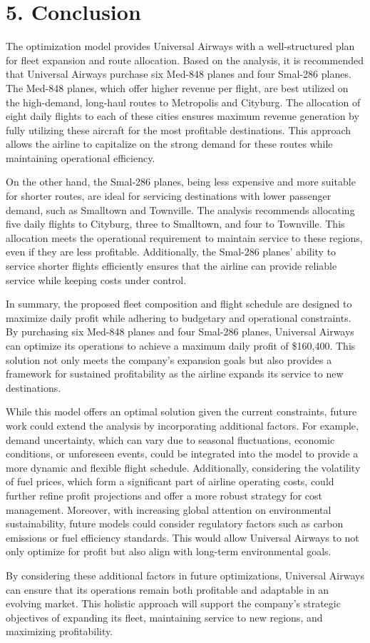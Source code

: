 \section*{5. Conclusion}

The optimization model provides Universal Airways with a well-structured plan for fleet expansion and route allocation. Based on the analysis, it is recommended that Universal Airways purchase six Med-848 planes and four Smal-286 planes. The Med-848 planes, which offer higher revenue per flight, are best utilized on the high-demand, long-haul routes to Metropolis and Cityburg. The allocation of eight daily flights to each of these cities ensures maximum revenue generation by fully utilizing these aircraft for the most profitable destinations. This approach allows the airline to capitalize on the strong demand for these routes while maintaining operational efficiency.

On the other hand, the Smal-286 planes, being less expensive and more suitable for shorter routes, are ideal for servicing destinations with lower passenger demand, such as Smalltown and Townville. The analysis recommends allocating five daily flights to Cityburg, three to Smalltown, and four to Townville. This allocation meets the operational requirement to maintain service to these regions, even if they are less profitable. Additionally, the Smal-286 planes' ability to service shorter flights efficiently ensures that the airline can provide reliable service while keeping costs under control.

In summary, the proposed fleet composition and flight schedule are designed to maximize daily profit while adhering to budgetary and operational constraints. By purchasing six Med-848 planes and four Smal-286 planes, Universal Airways can optimize its operations to achieve a maximum daily profit of \$160,400. This solution not only meets the company's expansion goals but also provides a framework for sustained profitability as the airline expands its service to new destinations.

While this model offers an optimal solution given the current constraints, future work could extend the analysis by incorporating additional factors. For example, demand uncertainty, which can vary due to seasonal fluctuations, economic conditions, or unforeseen events, could be integrated into the model to provide a more dynamic and flexible flight schedule. Additionally, considering the volatility of fuel prices, which form a significant part of airline operating costs, could further refine profit projections and offer a more robust strategy for cost management. Moreover, with increasing global attention on environmental sustainability, future models could consider regulatory factors such as carbon emissions or fuel efficiency standards. This would allow Universal Airways to not only optimize for profit but also align with long-term environmental goals.

By considering these additional factors in future optimizations, Universal Airways can ensure that its operations remain both profitable and adaptable in an evolving market. This holistic approach will support the company’s strategic objectives of expanding its fleet, maintaining service to new regions, and maximizing profitability.

